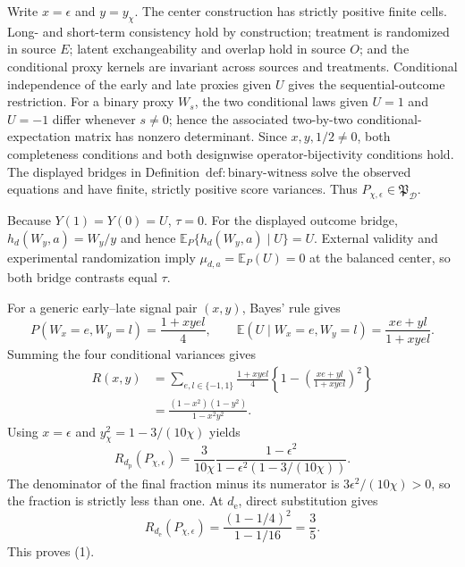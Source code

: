 Write \(x=\epsilon\) and \(y=y_\chi\).  The center construction has strictly positive finite cells.  Long- and short-term consistency hold by construction; treatment is randomized in source \(E\); latent exchangeability and overlap hold in source \(O\); and the conditional proxy kernels are invariant across sources and treatments.  Conditional independence of the early and late proxies given \(U\) gives the sequential-outcome restriction.  For a binary proxy \(W_s\), the two conditional laws given \(U=1\) and \(U=-1\) differ whenever \(s\ne0\); hence the associated two-by-two conditional-expectation matrix has nonzero determinant.  Since \(x,y,1/2\ne0\), both completeness conditions and both designwise operator-bijectivity conditions hold.  The displayed bridges in Definition~\(\mathrm{def{:}binary\text{-}witness}\) solve the observed equations and have finite, strictly positive score variances.  Thus \(P_{\chi,\epsilon}\in\mathfrak P_{\mathcal D}\).

Because \(Y(1)=Y(0)=U\), \(\tau=0\).  For the displayed outcome bridge, \(h_d(W_y,a)=W_y/y\) and hence \(\mathbb E_P\{h_d(W_y,a)\mid U\}=U\).  External validity and experimental randomization imply \(\mu_{d,a}=\mathbb E_P(U)=0\) at the balanced center, so both bridge contrasts equal \(\tau\).

For a generic early--late signal pair \((x,y)\), Bayes' rule gives
\[
 P(W_x=e,W_y=l)=\frac{1+xyel}{4},
 \qquad
 \mathbb E(U\mid W_x=e,W_y=l)=\frac{xe+yl}{1+xyel}.
\]
Summing the four conditional variances gives
\[
\begin{aligned}
 R(x,y)
 &=\sum_{e,l\in\{-1,1\}}\frac{1+xyel}{4}
 \left\{1-\left(\frac{xe+yl}{1+xyel}\right)^2\right\}\\
 &=\frac{(1-x^2)(1-y^2)}{1-x^2y^2}.
\end{aligned}
\]
Using \(x=\epsilon\) and \(y_\chi^2=1-3/(10\chi)\) yields
\[
 R_{d_{\mathrm p}}(P_{\chi,\epsilon})
 =\frac{3}{10\chi}\frac{1-\epsilon^2}
 {1-\epsilon^2(1-3/(10\chi))}.
\]
The denominator of the final fraction minus its numerator is \(3\epsilon^2/(10\chi)>0\), so the fraction is strictly less than one.  At \(d_{\mathrm e}\), direct substitution gives
\[
 R_{d_{\mathrm e}}(P_{\chi,\epsilon})
 =\frac{(1-1/4)^2}{1-1/16}=\frac35.
\]
This proves (1).

